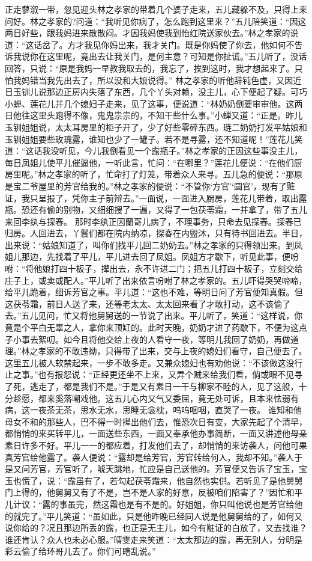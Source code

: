 \documentclass[12pt,oneside]{book}
\begin{document}
正走蓼溆一带，忽见迎头林之孝家的带着几个婆子走来，五儿藏躲不及，只得上来问好。林之孝家的?问道：“我听见你病了，怎么跑到这里来？”五儿陪笑道：“因这两日好些，跟我妈进来散散闷。才因我妈使我到怡红院送家伙去。”林之孝家的说道：“这话岔了。方才我见你妈出来，我才关门。既是你妈使了你去，他如何不告诉我说你在这里呢，竟出去让我关门，是何主意？可知是你扯谎。”五儿听了，没话回答，只说：“原是我妈一早教我取去的，我忘了，挨到这时，我才想起来了。只怕我妈错当我先出去了，所以没和大娘说得。”
林之孝家的听他辞钝色虚，又因近日玉钏儿说那边正房内失落了东西，几个丫头对赖，没主儿，心下便起了疑。可巧小蝉、莲花儿并几个媳妇子走来，见了这事，便说道：“林奶奶倒要审审他。这两日他往这里头跑得不像，鬼鬼祟祟的，不知干些什么事。”小蝉又道：“正是。昨儿玉钏姐姐说，太太耳房里的柜子开了，少了好些零碎东西。琏二奶奶打发平姑娘和玉钏姐姐要些玫瑰露，谁知也少了一罐子。若不是寻露，还不知道呢！”莲花儿笑道：“这话我没听见，今儿我倒看见一个露瓶子。”林之孝家的正因这些事没主儿，每日凤姐儿使平儿催逼他，一听此言，忙问：“在哪里？”莲花儿便说：“在他们厨房里呢。”林之孝家的听了，忙命打了灯笼，带着众人来寻。五儿急的便说：“那原是宝二爷屋里的芳官给我的。”林之孝家的便说：“不管你‘方官’‘圆官’，现有了赃证，我只呈报了，凭你主子前辩去。”一面说，一面进入厨房，莲花儿带着，取出露瓶。恐还有偷的别物，又细细搜了一遍，又得了一包茯苓霜，一并拿了，带了五儿来回李纨与探春。
那时李纨正因蘭哥儿病了，不理事务，只命去见探春。探春已归房。人回进去，丫鬟们都在院内纳凉，探春在内盥沐，只有待书回进去。半日，出来说：“姑娘知道了，叫你们找平儿回二奶奶去。”林之孝家的只得领出来。到凤姐儿那边，先找着了平儿，平儿进去回了凤姐。凤姐方才歇下，听见此事，便吩咐：“将他娘打四十板子，撵出去，永不许进二门；把五儿打四十板子，立刻交给庄子上，或卖或配人。”平儿听了出来依言吩咐了林之孝家的。五儿吓得哭哭啼啼，给平儿跪着，细诉芳官之事。平儿道：“这也不难，等明日问了芳官便知真假。但这茯苓霜，前日人送了来，还等老太太、太太回来看了才敢打动，这不该偷了去。”五儿见问，忙又将他舅舅送的一节说了出来。平儿听了，笑道：“这样说，你竟是个平白无辜之人，拿你来顶缸的。此时天晚，奶奶才进了药歇下，不便为这点子小事去絮叨。如今且将他交给上夜的人看守一夜，等明儿我回了奶奶，再做道理。”林之孝家的不敢违拗，只得带了出来，交与上夜的媳妇们看守，自己便去了。
这里五儿被人软禁起来，一步不敢多走。又兼众媳妇也有劝他说：“不该做这没行止之事。”也有报怨说：“正经更还坐不上来，又弄个贼来给我们看，倘或眼不见寻了死，逃走了，都是我们不是。”于是又有素日一干与柳家不睦的人，见了这般，十分趁愿，都来奚落嘲戏他。这五儿心内又气又委屈，竟无处可诉，且本来怯弱有病，这一夜茶无茶，思水无水，思睡无衾枕，呜呜咽咽，直哭了一夜。
谁知和他母女不和的那些人，巴不得一时撵出他们去，惟恐次日有变，大家先起了个清早，都悄悄的来买转平儿，一面送些东西，一面又奉承他办事简断，一面又讲述他母亲素日许多不好。平儿一一的都应着，打发他们去了，却悄悄的来访袭人，问他可果真芳官给他露了。袭人便说：“露却是给芳官，芳官转给何人，我却不知。”袭人于是又问芳官，芳官听了，唬天跳地，忙应是自己送他的。芳官便又告诉了宝玉，宝玉也慌了，说：“露虽有了，若勾起茯苓霜来，他自然也实供。若听见了是他舅舅门上得的，他舅舅又有了不是，岂不是人家的好意，反被咱们陷害了？”因忙和平儿计议：“露的事虽完，然这霜也是有不是的。好姐姐，你只叫他说也是芳官给他的就完了。”平儿笑道：“虽如此，只是他昨晚已经同人说是他舅舅给的了，如何又说你给的？况且那边所丢的露，也正是无主儿，如今有赃证的白放了，又去找谁？谁还肯认？众人也未必心服。”晴雯走来笑道：“太太那边的露，再无别人，分明是彩云偷了给环哥儿去了。你们可瞎乱说。”
\end{document}
